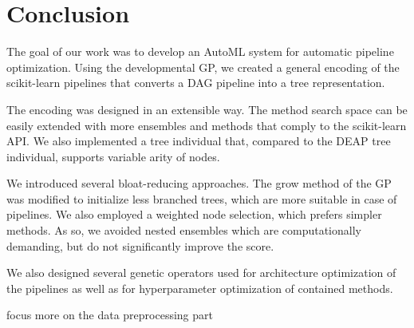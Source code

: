 \chapter*{Conclusion}

The goal of our work was to develop an AutoML system for automatic
pipeline optimization. Using the developmental GP, we created a general encoding
of the scikit-learn pipelines that converts a DAG pipeline into a tree representation.

The encoding was designed in an extensible way. The method search space can be easily 
extended with more ensembles and methods that comply to the scikit-learn API.
We also implemented a tree individual that, compared to the DEAP tree individual, supports
variable arity of nodes.

We introduced several bloat-reducing approaches. The grow method of the GP was
modified to initialize less branched trees, which are more suitable in case of
pipelines. We also employed a weighted node selection, which prefers simpler methods.
As so, we avoided nested ensembles which are computationally demanding, but do not
significantly improve the score.

We also designed several genetic operators used for architecture optimization of the
pipelines as well as for hyperparameter optimization of contained methods.




focus more on the data preprocessing part